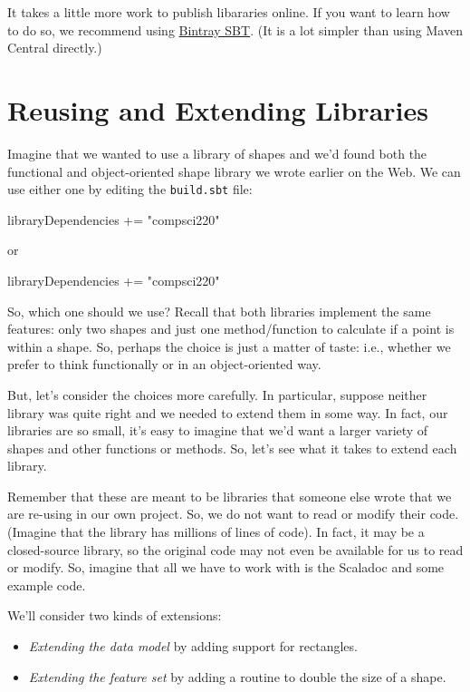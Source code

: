 \documentclass{book}
\begin{document}
It takes a little more work to publish libararies online.
If you want to learn how to do so, we recommend using
\href{https://github.com/softprops/bintray-sbt}{Bintray SBT}. (It is a lot
simpler than using Maven Central directly.)

\section{Reusing and Extending Libraries}

Imagine that we wanted to use a library of shapes and we'd found both the functional
and object-oriented shape library we wrote earlier on the Web. We can use
either one by editing the \texttt{build.sbt} file:

\begin{scalacode}
libraryDependencies += "compsci220" %
\end{scalacode}
or
\begin{scalacode}
libraryDependencies += "compsci220" %
\end{scalacode}

So, which one should we use? Recall that both libraries implement the same
features: only two shapes and just one method/function to calculate if
a point is within a shape. So, perhaps the choice is just a matter of taste:
i.e., whether we prefer to think functionally or in an object-oriented way.

But, let's consider the choices more carefully. In particular, suppose neither
library was quite right and we needed to extend them in some way. In fact,
our libraries are so small, it's easy to imagine that we'd want a larger
variety of shapes and other functions or methods. So, let's see what it
takes to extend each library.

Remember that these are meant to be libraries that someone else wrote that
we are re-using in our own project. So, we do not want to read or modify their code. (Imagine that
the library has millions of lines of code). In fact, it may be a closed-source
library, so the original code may not even be available for us to read or modify.
So, imagine that all we have to work with is the Scaladoc and some example code.

We'll consider two kinds of extensions:

\begin{itemize}

  \item \emph{Extending the data model} by adding support for rectangles.

  \item \emph{Extending the feature set} by adding a routine to
  double the size of a shape.

\end{itemize}
\end{document}
